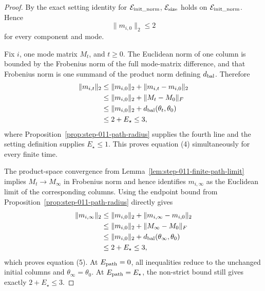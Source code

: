 \begin{proof}
By the exact setting identity for \(\mathcal E_{\rm init\_norm}\),
\(\mathcal E_{\rm size}\) holds on
\(\mathcal E_{\rm init\_norm}\). Hence
\[
  \|m_{i,0}\|_2\le2
\]
for every component and mode.

Fix \(i\), one mode matrix \(M_t\), and \(t\ge0\). The Euclidean norm of one
column is bounded by the Frobenius norm of the full mode-matrix difference,
and that Frobenius norm is one summand of the product norm defining
\(d_{\rm bal}\). Therefore
\[
\begin{aligned}
  \|m_{i,t}\|_2
  &\le \|m_{i,0}\|_2+\|m_{i,t}-m_{i,0}\|_2\\
  &\le \|m_{i,0}\|_2+\|M_t-M_0\|_F\\
  &\le \|m_{i,0}\|_2+d_{\rm bal}(\theta_t,\theta_0)\\
  &\le2+E_\star\le3,
\end{aligned}
\]
where Proposition~\ref{prop:step-011-path-radius} supplies the fourth line and
the setting definition supplies \(E_\star\le1\). This proves equation (4)
simultaneously for every finite time.

The product-space convergence from
Lemma~\ref{lem:step-011-finite-path-limit} implies
\(M_t\to M_\infty\) in Frobenius norm and hence identifies
\(m_{i,\infty}\) as the Euclidean limit of the corresponding columns.
Using the endpoint bound from Proposition~\ref{prop:step-011-path-radius}
directly gives
\[
\begin{aligned}
  \|m_{i,\infty}\|_2
  &\le\|m_{i,0}\|_2+\|m_{i,\infty}-m_{i,0}\|_2\\
  &\le\|m_{i,0}\|_2+\|M_\infty-M_0\|_F\\
  &\le\|m_{i,0}\|_2+d_{\rm bal}(\theta_\infty,\theta_0)\\
  &\le2+E_\star\le3,
\end{aligned}
\]
which proves equation (5). At \(E_{\rm path}=0\), all inequalities reduce to
the unchanged initial columns and \(\theta_\infty=\theta_0\). At
\(E_{\rm path}=E_\star\), the non-strict bound still gives exactly
\(2+E_\star\le3\). 

\end{proof}

